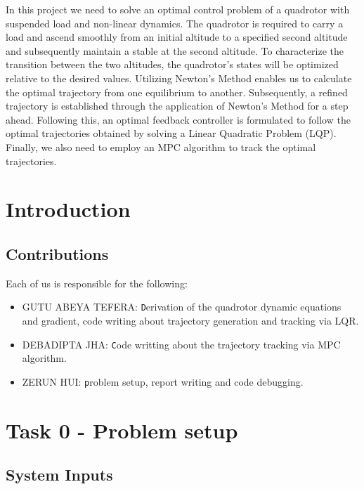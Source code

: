 \documentclass[a4paper,11pt,oneside]{book}
\begin{document}
In this project we need to solve an optimal control problem of a quadrotor with suspended load and non-linear dynamics. The quadrotor is required to carry a load and ascend smoothly from an initial altitude to a specified second altitude and subsequently maintain a stable at the second altitude. To characterize the transition between the two altitudes, the quadrotor's states will be optimized relative to the desired values. Utilizing Newton's Method enables us to calculate the optimal trajectory from one equilibrium to another. Subsequently, a refined trajectory is established through the application of Newton's Method for a step ahead. Following this, an optimal feedback controller is formulated to follow the optimal trajectories obtained by solving a Linear Quadratic Problem (LQP). Finally, we also need to employ an MPC algorithm to track the optimal trajectories.

\tableofcontents \thispagestyle{empty}

\chapter*{Introduction}

\section*{Contributions}
Each of us is responsible for the following:
\begin{itemize}
      \item GUTU ABEYA TEFERA:
\texttt Derivation of the quadrotor dynamic equations and gradient, code writing about trajectory generation and tracking via LQR.
      \item DEBADIPTA JHA:
\texttt Code writting about the trajectory tracking via MPC algorithm.
      \item ZERUN HUI:
\texttt problem setup, report writing and code debugging.

\end{itemize}

\chapter{Task 0 - Problem setup}
\section{System Inputs}
\end{document}
